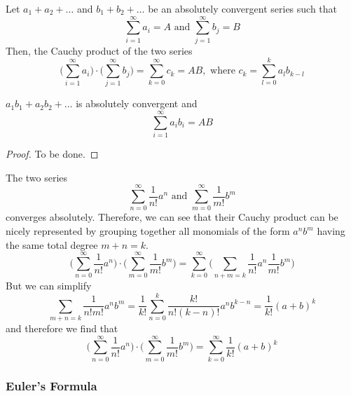     \begin{theorem}
    Let $a_1 + a_2 + \ldots$ and $b_1 + b_2 + \ldots$ be an absolutely convergent series such that
    \[\sum_{i=1}^\infty a_i = A \text{ and } \sum_{j=1}^\infty b_j = B\]
    Then, the Cauchy product of the two series 
    \[\bigg( \sum_{i=1}^\infty a_i \bigg) \cdot \bigg( \sum_{j=1}^\infty b_j \bigg) = \sum_{k=0}^\infty c_k = A B, \text{ where } c_k = \sum_{l=0}^k a_l b_{k-l}\]

    $a_1 b_1 + a_2 b_2 + \ldots$ is absolutely convergent and 
    \[\sum_{i = 1}^\infty a_i b_i = A B\]
    \end{theorem}
    \begin{proof}
    To be done. 
    \end{proof}

      \begin{example}
      The two series 
      \[\sum_{n = 0}^\infty \frac{1}{n!} a^n \text{ and } \sum_{m = 0}^\infty \frac{1}{m!} b^m\]
      converges absolutely. Therefore, we can see that their Cauchy product can be nicely represented by grouping together all monomials of the form $a^n b^m$ having the same total degree $m + n = k$. 
      \[\bigg( \sum_{n = 0}^\infty \frac{1}{n!} a^n \bigg) \cdot \bigg( \sum_{m = 0}^\infty \frac{1}{m!} b^m \bigg) = \sum_{k=0}^\infty \bigg(\sum_{n+m=k} \frac{1}{n!} a^n \frac{1}{m!} b^m \bigg)\]
      But we can simplify 
      \[\sum_{m + n = k} \frac{1}{n! m!} a^n b^m = \frac{1}{k!} \sum_{n=0}^k \frac{k!}{n! (k-n)!} a^n b^{k-n} = \frac{1}{k!} (a + b)^k\]
      and therefore we find that 
      \[\bigg( \sum_{n = 0}^\infty \frac{1}{n!} a^n \bigg) \cdot \bigg( \sum_{m = 0}^\infty \frac{1}{m!} b^m \bigg) = \sum_{k=0}^\infty \frac{1}{k!} (a + b)^k\]
    \end{example}

      \subsubsection{Euler's Formula}

